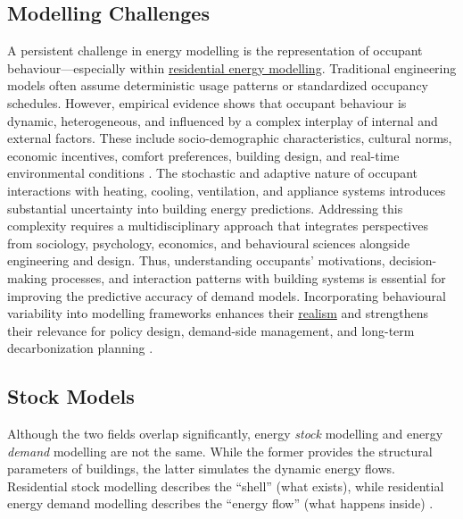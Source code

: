 \subsection{Modelling Challenges}
A persistent challenge in energy modelling is the representation of occupant behaviour—especially within \hyperref[sec:residential_eED_modelling]{residential energy modelling}. Traditional engineering models often assume deterministic usage patterns or standardized occupancy schedules. However, empirical evidence shows that occupant behaviour is dynamic, heterogeneous, and influenced by a complex interplay of internal and external factors. These include socio-demographic characteristics, cultural norms, economic incentives, comfort preferences, building design, and real-time environmental conditions \cite{delzendehImpactOccupantsBehaviours2017}. The stochastic and adaptive nature of occupant interactions with heating, cooling, ventilation, and appliance systems introduces substantial uncertainty into building energy predictions. Addressing this complexity requires a multidisciplinary approach that integrates perspectives from sociology, psychology, economics, and behavioural sciences alongside engineering and design. 
\newline Thus, understanding occupants’ motivations, decision-making processes, and interaction patterns with building systems is essential for improving the predictive accuracy of demand models. Incorporating behavioural variability into modelling frameworks enhances their \hyperref[sec:realism]{realism} and strengthens their relevance for policy design, demand-side management, and long-term decarbonization planning \cite{delzendehImpactOccupantsBehaviours2017}.


\subsection{Stock Models}
Although the two fields overlap significantly, energy \textit{stock} modelling and energy \textit{demand} modelling are not the same. While the former provides the structural parameters of buildings, the latter simulates the dynamic energy flows. Residential stock modelling describes the ``shell'' (what exists), while residential energy demand modelling describes the ``energy flow'' (what happens inside) \cite{mahmoudOpportunitiesLimitationsBuilding2020}.

